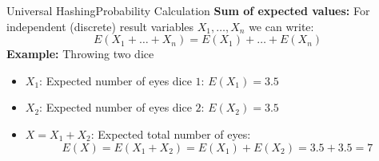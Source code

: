 


\begin{frame}{Universal Hashing}{Probability Calculation}
   \textbf{Sum of expected values:}
   For independent (discrete) result variables {\color{Mittel-Blau}$X_1,\dots,X_n$} we can write:
     {\color{Mittel-Blau}\[E\left(X_1+\dots+X_n\right)
       = E(X_1) + \dots + E(X_n)\]}
   \textbf{Example:} Throwing two dice
   \begin{itemize}
     \item<3->
       {\color{Mittel-Blau}$X_1$}: Expected number of eyes dice {\color{Mittel-Blau}$1$}: {\color{Mittel-Blau}$E(X_1) = 3.5$}
     \item<4->
       {\color{Mittel-Blau}$X_2$}: Expected number of eyes dice {\color{Mittel-Blau}$2$}: {\color{Mittel-Blau}$E(X_2) = 3.5$}
     \item<5->
       {\color{Mittel-Blau}$X = X_1 + X_2$}: Expected total number of eyes:
       {\color{Mittel-Blau}\[E(X)
         = E(X_1 + X_2)
         = E(X_1) + E(X_2) = 3.5 + 3.5 = 7\]}
   \end{itemize}
\end{frame}

